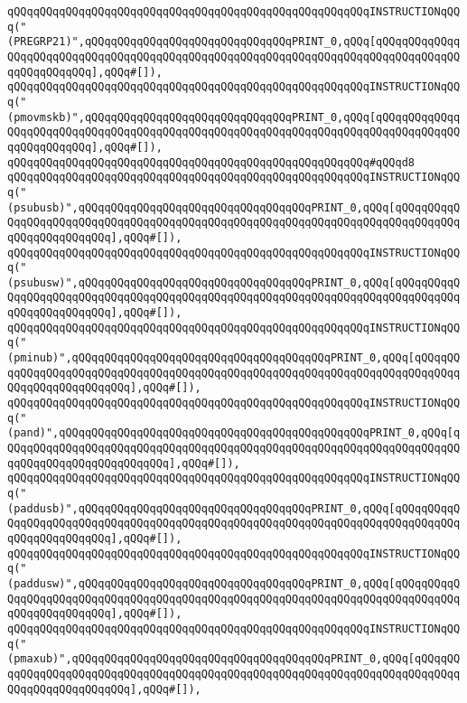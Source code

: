 \verb|qQQqqQQqqQQqqQQqqQQqqQQqqQQqqQQqqQQqqQQqqQQqqQQqqQQqqQQqINSTRUCTIONqQQq("(PREGRP21)",qQQqqQQqqQQqqQQqqQQqqQQqqQQqqQQqPRINT_0,qQQq[qQQqqQQqqQQqqQQqqQQqqQQqqQQqqQQqqQQqqQQqqQQqqQQqqQQqqQQqqQQqqQQqqQQqqQQqqQQqqQQqqQQqqQQqqQQqqQQq],qQQq#[]),|\newline
\verb|qQQqqQQqqQQqqQQqqQQqqQQqqQQqqQQqqQQqqQQqqQQqqQQqqQQqqQQqINSTRUCTIONqQQq("(pmovmskb)",qQQqqQQqqQQqqQQqqQQqqQQqqQQqqQQqPRINT_0,qQQq[qQQqqQQqqQQqqQQqqQQqqQQqqQQqqQQqqQQqqQQqqQQqqQQqqQQqqQQqqQQqqQQqqQQqqQQqqQQqqQQqqQQqqQQqqQQqqQQq],qQQq#[]),|\newline
\verb|qQQqqQQqqQQqqQQqqQQqqQQqqQQqqQQqqQQqqQQqqQQqqQQqqQQqqQQq#qQQqd8|\newline
\verb|qQQqqQQqqQQqqQQqqQQqqQQqqQQqqQQqqQQqqQQqqQQqqQQqqQQqqQQqINSTRUCTIONqQQq("(psubusb)",qQQqqQQqqQQqqQQqqQQqqQQqqQQqqQQqqQQqPRINT_0,qQQq[qQQqqQQqqQQqqQQqqQQqqQQqqQQqqQQqqQQqqQQqqQQqqQQqqQQqqQQqqQQqqQQqqQQqqQQqqQQqqQQqqQQqqQQqqQQqqQQq],qQQq#[]),|\newline
\verb|qQQqqQQqqQQqqQQqqQQqqQQqqQQqqQQqqQQqqQQqqQQqqQQqqQQqqQQqINSTRUCTIONqQQq("(psubusw)",qQQqqQQqqQQqqQQqqQQqqQQqqQQqqQQqqQQqPRINT_0,qQQq[qQQqqQQqqQQqqQQqqQQqqQQqqQQqqQQqqQQqqQQqqQQqqQQqqQQqqQQqqQQqqQQqqQQqqQQqqQQqqQQqqQQqqQQqqQQqqQQq],qQQq#[]),|\newline
\verb|qQQqqQQqqQQqqQQqqQQqqQQqqQQqqQQqqQQqqQQqqQQqqQQqqQQqqQQqINSTRUCTIONqQQq("(pminub)",qQQqqQQqqQQqqQQqqQQqqQQqqQQqqQQqqQQqqQQqPRINT_0,qQQq[qQQqqQQqqQQqqQQqqQQqqQQqqQQqqQQqqQQqqQQqqQQqqQQqqQQqqQQqqQQqqQQqqQQqqQQqqQQqqQQqqQQqqQQqqQQqqQQq],qQQq#[]),|\newline
\verb|qQQqqQQqqQQqqQQqqQQqqQQqqQQqqQQqqQQqqQQqqQQqqQQqqQQqqQQqINSTRUCTIONqQQq("(pand)",qQQqqQQqqQQqqQQqqQQqqQQqqQQqqQQqqQQqqQQqqQQqqQQqPRINT_0,qQQq[qQQqqQQqqQQqqQQqqQQqqQQqqQQqqQQqqQQqqQQqqQQqqQQqqQQqqQQqqQQqqQQqqQQqqQQqqQQqqQQqqQQqqQQqqQQqqQQq],qQQq#[]),|\newline
\verb|qQQqqQQqqQQqqQQqqQQqqQQqqQQqqQQqqQQqqQQqqQQqqQQqqQQqqQQqINSTRUCTIONqQQq("(paddusb)",qQQqqQQqqQQqqQQqqQQqqQQqqQQqqQQqqQQqPRINT_0,qQQq[qQQqqQQqqQQqqQQqqQQqqQQqqQQqqQQqqQQqqQQqqQQqqQQqqQQqqQQqqQQqqQQqqQQqqQQqqQQqqQQqqQQqqQQqqQQqqQQq],qQQq#[]),|\newline
\verb|qQQqqQQqqQQqqQQqqQQqqQQqqQQqqQQqqQQqqQQqqQQqqQQqqQQqqQQqINSTRUCTIONqQQq("(paddusw)",qQQqqQQqqQQqqQQqqQQqqQQqqQQqqQQqqQQqPRINT_0,qQQq[qQQqqQQqqQQqqQQqqQQqqQQqqQQqqQQqqQQqqQQqqQQqqQQqqQQqqQQqqQQqqQQqqQQqqQQqqQQqqQQqqQQqqQQqqQQqqQQq],qQQq#[]),|\newline
\verb|qQQqqQQqqQQqqQQqqQQqqQQqqQQqqQQqqQQqqQQqqQQqqQQqqQQqqQQqINSTRUCTIONqQQq("(pmaxub)",qQQqqQQqqQQqqQQqqQQqqQQqqQQqqQQqqQQqqQQqPRINT_0,qQQq[qQQqqQQqqQQqqQQqqQQqqQQqqQQqqQQqqQQqqQQqqQQqqQQqqQQqqQQqqQQqqQQqqQQqqQQqqQQqqQQqqQQqqQQqqQQqqQQq],qQQq#[]),|\newline

